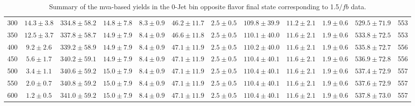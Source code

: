 \begin{table}
{\begin{center}
\begin{tabular}{l c c c c c c c c c c c }
300 & $14.3\pm3.8$ & $334.8\pm58.2$ & $14.8\pm7.8$ & $8.3\pm0.9$ & $46.2\pm11.7$ & $2.5\pm0.5$ & $109.8\pm39.9$ & $11.2\pm2.1$ & $1.9\pm0.6$ & $529.5\pm71.9$ & 553 \\
350 & $12.5\pm3.7$ & $337.8\pm58.7$ & $14.9\pm7.9$ & $8.4\pm0.9$ & $46.6\pm11.8$ & $2.5\pm0.5$ & $110.1\pm40.0$ & $11.6\pm2.1$ & $1.9\pm0.6$ & $533.8\pm72.5$ & 553 \\
400 & $9.2\pm2.6$ & $339.2\pm58.9$ & $14.9\pm7.9$ & $8.4\pm0.9$ & $47.1\pm11.9$ & $2.5\pm0.5$ & $110.2\pm40.0$ & $11.6\pm2.1$ & $1.9\pm0.6$ & $535.8\pm72.7$ & 556 \\
450 & $5.6\pm1.7$ & $340.2\pm59.1$ & $14.9\pm7.9$ & $8.4\pm0.9$ & $47.1\pm11.9$ & $2.5\pm0.5$ & $110.4\pm40.1$ & $11.6\pm2.1$ & $1.9\pm0.6$ & $536.9\pm72.8$ & 556 \\
500 & $3.4\pm1.1$ & $340.6\pm59.2$ & $15.0\pm7.9$ & $8.4\pm0.9$ & $47.1\pm11.9$ & $2.5\pm0.5$ & $110.4\pm40.1$ & $11.6\pm2.1$ & $1.9\pm0.6$ & $537.4\pm72.9$ & 557 \\
550 & $2.0\pm0.7$ & $340.8\pm59.2$ & $15.0\pm7.9$ & $8.4\pm0.9$ & $47.1\pm11.9$ & $2.5\pm0.5$ & $110.4\pm40.1$ & $11.6\pm2.1$ & $1.9\pm0.6$ & $537.6\pm72.9$ & 557 \\
600 & $1.2\pm0.5$ & $341.0\pm59.2$ & $15.0\pm7.9$ & $8.4\pm0.9$ & $47.1\pm11.9$ & $2.5\pm0.5$ & $110.4\pm40.1$ & $11.6\pm2.1$ & $1.9\pm0.6$ & $537.8\pm73.0$ & 557 \\
\hline
\end{tabular}
\end{center}
}
\caption{Summary of the mva-based yields in the 0-Jet bin opposite flavor final state corresponding to 1.5$/fb$ data.}
\end{table}
